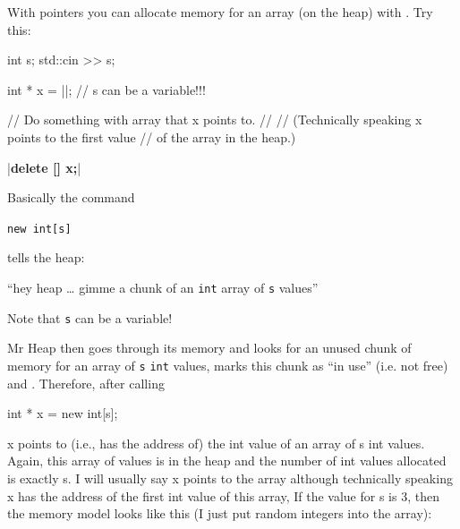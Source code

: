 











\newpage{}

With pointers you can allocate memory for an array (on the heap) with . Try this:

\begin{consolethree}[escapeinside=||]
int s;
std::cin >> s;

int * x = ||; // s can be a variable!!!

// Do something with array that x points to.
//
// (Technically speaking x points to the first value
// of the array in the heap.)

|\textbf{delete [] x;}|
\end{consolethree}

Basically the command

\verb!new int[s]!

tells the heap:

``hey heap \ldots{} gimme a chunk of an \texttt{int} array of \texttt{s} values''

Note that \texttt{s} can be a variable!

Mr Heap then goes through its memory and looks for an unused  chunk of memory for an array of \texttt{s} \texttt{int} values, marks this chunk as ``in use'' (i.e. not free) and \texttt{}. Therefore, after calling

\begin{consolethree}[escapeinside=||]
int * x = new int[s];
\end{consolethree}

x points to (i.e., has the address of) the  int value of an array of s int values. Again, this array of values is in the heap and the number of int values allocated is exactly s. I will usually say x points to the array although technically speaking x has the address of the first int value of this array, If the value for s is 3, then the memory model looks like this (I just put random integers into the array):

